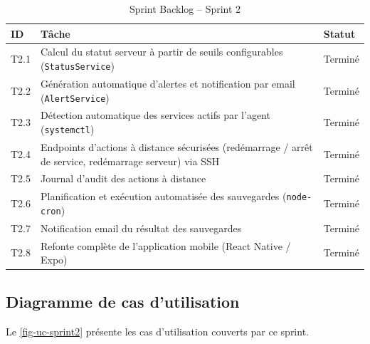 \begin{table}[H]
\centering
\caption{Sprint Backlog -- Sprint 2}
\small
\begin{tabularx}{\linewidth}{@{}p{1.3cm}Xl@{}}
\toprule
\textbf{ID} & \textbf{Tâche} & \textbf{Statut} \\
\midrule
T2.1 & Calcul du statut serveur à partir de seuils configurables (\texttt{StatusService}) & Terminé \\
T2.2 & Génération automatique d'alertes et notification par email (\texttt{AlertService}) & Terminé \\
T2.3 & Détection automatique des services actifs par l'agent (\texttt{systemctl}) & Terminé \\
T2.4 & Endpoints d'actions à distance sécurisées (redémarrage / arrêt de service, redémarrage serveur) via SSH & Terminé \\
T2.5 & Journal d'audit des actions à distance & Terminé \\
T2.6 & Planification et exécution automatisée des sauvegardes (\texttt{node-cron}) & Terminé \\
T2.7 & Notification email du résultat des sauvegardes & Terminé \\
T2.8 & Refonte complète de l'application mobile (React Native / Expo) & Terminé \\
\bottomrule
\end{tabularx}
\end{table}

\subsection{Diagramme de cas d'utilisation}

Le \cref{fig-uc-sprint2} présente les cas d'utilisation couverts par ce sprint.

